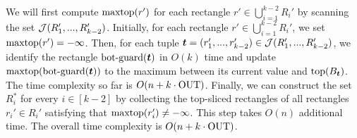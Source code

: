 We will first compute $\mathrm{maxtop}(r')$ for each rectangle $r' \in \bigcup_{i = 1}^{k-2}R_{i}'$ by scanning the set $\mathcal{J}(R_1',...,R_{k-2}')$. Initially, for each rectangle $r' \in \bigcup_{i = 1}^{k-2}R_{i}'$, we set $\mathrm{maxtop}(r') = -\infty$. Then, for each tuple $\textrm{\boldmath${t}$} = (r_1',...,r_{k-2}') \in \mathcal{J}(R_1',...,R_{k-2}')$, we identify the rectangle $\mathrm{bot\text{-}guard}(\textrm{\boldmath${t}$})$ in $O(k)$ time and 
 update $\mathrm{maxtop}(\mathrm{bot\text{-}guard}(\textrm{\boldmath${t}$}))$ to the maximum between its current value and $\mathrm{top}(B_{\textrm{\boldmath${t}$}})$. The time complexity so far is $O(n + k\cdot \mathrm{OUT})$.
Finally, we can construct the set $R_i^*$ for every $i \in [k-2]$ by collecting the top-sliced rectangles of all rectangles $r_i' \in R_i'$ satisfying that $\mathrm{maxtop}(r_i')\neq -\infty$. This step takes $O(n)$ additional time. The overall time complexity is $O(n + k\cdot \mathrm{OUT})$.